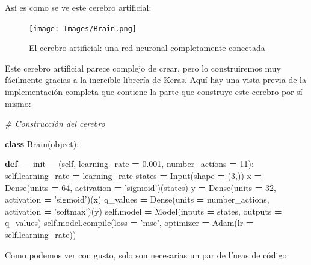 \documentclass[]{book}
\newenvironment{Shaded}{\begin{snugshade}}{\end{snugshade}}
\newcommand{\BuiltInTok}[1]{#1}
\newcommand{\CommentTok}[1]{\textcolor[rgb]{0.56,0.35,0.01}{\textit{#1}}}
\newcommand{\DecValTok}[1]{\textcolor[rgb]{0.00,0.00,0.81}{#1}}
\newcommand{\FloatTok}[1]{\textcolor[rgb]{0.00,0.00,0.81}{#1}}
\newcommand{\FunctionTok}[1]{\textcolor[rgb]{0.00,0.00,0.00}{#1}}
\newcommand{\KeywordTok}[1]{\textcolor[rgb]{0.13,0.29,0.53}{\textbf{#1}}}
\newcommand{\NormalTok}[1]{#1}
\newcommand{\OperatorTok}[1]{\textcolor[rgb]{0.81,0.36,0.00}{\textbf{#1}}}
\newcommand{\StringTok}[1]{\textcolor[rgb]{0.31,0.60,0.02}{#1}}
\newcommand{\VariableTok}[1]{\textcolor[rgb]{0.00,0.00,0.00}{#1}}
\begin{document}
Así es como se ve este cerebro artificial:

\begin{figure}
\centering
\texttt{[image: Images/Brain.png]}
\caption{El cerebro artificial: una red neuronal completamente conectada}
\end{figure}

Este cerebro artificial parece complejo de crear, pero lo construiremos muy fácilmente gracias a la increíble librería de Keras. Aquí hay una vista previa de la implementación completa que contiene la parte que construye este cerebro por sí mismo:\\

\begin{Shaded}
\begin{Highlighting}[]
\CommentTok{# Construcción del cerebro}

\KeywordTok{class}\NormalTok{ Brain(}\BuiltInTok{object}\NormalTok{):}

    \KeywordTok{def} \FunctionTok{__init__}\NormalTok{(}\VariableTok{self}\NormalTok{, learning_rate }\OperatorTok{=} \FloatTok{0.001}\NormalTok{, number_actions }\OperatorTok{=} \DecValTok{11}\NormalTok{):}
        \VariableTok{self}\NormalTok{.learning_rate }\OperatorTok{=}\NormalTok{ learning_rate}
\NormalTok{        states }\OperatorTok{=}\NormalTok{ Input(shape }\OperatorTok{=}\NormalTok{ (}\DecValTok{3}\NormalTok{,))}
\NormalTok{        x }\OperatorTok{=}\NormalTok{ Dense(units }\OperatorTok{=} \DecValTok{64}\NormalTok{, activation }\OperatorTok{=} \StringTok{'sigmoid'}\NormalTok{)(states)}
\NormalTok{        y }\OperatorTok{=}\NormalTok{ Dense(units }\OperatorTok{=} \DecValTok{32}\NormalTok{, activation }\OperatorTok{=} \StringTok{'sigmoid'}\NormalTok{)(x)}
\NormalTok{        q_values }\OperatorTok{=}\NormalTok{ Dense(units }\OperatorTok{=}\NormalTok{ number_actions, activation }\OperatorTok{=} \StringTok{'softmax'}\NormalTok{)(y)}
        \VariableTok{self}\NormalTok{.model }\OperatorTok{=}\NormalTok{ Model(inputs }\OperatorTok{=}\NormalTok{ states, outputs }\OperatorTok{=}\NormalTok{ q_values)}
        \VariableTok{self}\NormalTok{.model.}\BuiltInTok{compile}\NormalTok{(loss }\OperatorTok{=} \StringTok{'mse'}\NormalTok{, optimizer }\OperatorTok{=}\NormalTok{ Adam(lr }\OperatorTok{=} \VariableTok{self}\NormalTok{.learning_rate))}
\end{Highlighting}
\end{Shaded}

Como podemos ver con gusto, solo son necesarias un par de líneas de código.
\end{document}

